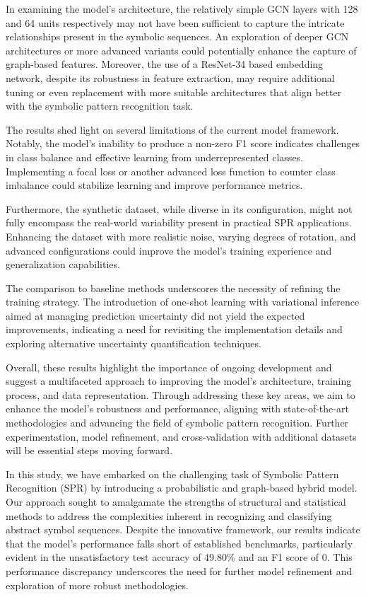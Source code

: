 \documentclass{article}
\begin{document}
In examining the model's architecture, the relatively simple GCN layers with 128 and 64 units respectively may not have been sufficient to capture the intricate relationships present in the symbolic sequences. An exploration of deeper GCN architectures or more advanced variants could potentially enhance the capture of graph-based features. Moreover, the use of a ResNet-34 based embedding network, despite its robustness in feature extraction, may require additional tuning or even replacement with more suitable architectures that align better with the symbolic pattern recognition task.

The results shed light on several limitations of the current model framework. Notably, the model's inability to produce a non-zero F1 score indicates challenges in class balance and effective learning from underrepresented classes. Implementing a focal loss or another advanced loss function to counter class imbalance could stabilize learning and improve performance metrics.

Furthermore, the synthetic dataset, while diverse in its configuration, might not fully encompass the real-world variability present in practical SPR applications. Enhancing the dataset with more realistic noise, varying degrees of rotation, and advanced configurations could improve the model's training experience and generalization capabilities.

The comparison to baseline methods underscores the necessity of refining the training strategy. The introduction of one-shot learning with variational inference aimed at managing prediction uncertainty did not yield the expected improvements, indicating a need for revisiting the implementation details and exploring alternative uncertainty quantification techniques.

Overall, these results highlight the importance of ongoing development and suggest a multifaceted approach to improving the model's architecture, training process, and data representation. Through addressing these key areas, we aim to enhance the model's robustness and performance, aligning with state-of-the-art methodologies and advancing the field of symbolic pattern recognition. Further experimentation, model refinement, and cross-validation with additional datasets will be essential steps moving forward.

In this study, we have embarked on the challenging task of Symbolic Pattern Recognition (SPR) by introducing a probabilistic and graph-based hybrid model. Our approach sought to amalgamate the strengths of structural and statistical methods to address the complexities inherent in recognizing and classifying abstract symbol sequences. Despite the innovative framework, our results indicate that the model's performance falls short of established benchmarks, particularly evident in the unsatisfactory test accuracy of 49.80\% and an F1 score of 0. This performance discrepancy underscores the need for further model refinement and exploration of more robust methodologies.
\end{document}
